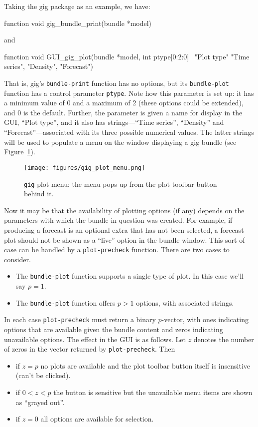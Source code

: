 \documentclass[oneside]{book}
\begin{document}
Taking the \textsf{gig} package as an example, we have:
%
\begin{code}
  function void gig_bundle_print(bundle *model)
\end{code}
%
and
%
\begin{code}
function void GUI_gig_plot(bundle *model, int ptype[0:2:0] \
                           "Plot type" {"Time series", "Density", "Forecast"})
\end{code}

That is, \textsf{gig}'s \texttt{bundle-print} function has no options,
but its \texttt{bundle-plot} function has a control parameter
\texttt{ptype}. Note how this parameter is set up: it has a minimum
value of 0 and a maximum of 2 (these options could be extended), and 0
is the default. Further, the parameter is given a name for display in
the GUI, ``Plot type'', and it also has strings---``Time series'',
``Density'' and ``Forecast''---associated with its three possible
numerical values. The latter strings will be used to populate a menu
on the window displaying a \textsf{gig} bundle
(see Figure~\ref{fig:gig-plot-menu}).
\vspace{1ex}

\begin{figure}[htbp]
  \begin{center}
  \texttt{[image: figures/gig\_plot\_menu.png]}
  \caption{\texttt{gig} plot menu: the menu pops up from the plot
    toolbar button behind it.}
  \label{fig:gig-plot-menu}
  \end{center}
\end{figure}

Now it may be that the availability of plotting options (if any)
depends on the parameters with which the bundle in question was
created. For example, if producing a forecast is an optional extra
that has not been selected, a forecast plot should not be shown as a
``live'' option in the bundle window. This sort of case can be handled
by a \texttt{plot-precheck} function. There are two cases to consider.
\begin{itemize}
\item The \texttt{bundle-plot} function supports a single type of
  plot. In this case we'll say $p = 1$.
\item The \texttt{bundle-plot} function offers $p > 1$ options, with
  associated strings.
\end{itemize}
In each case \texttt{plot-precheck} must return a binary $p$-vector,
with ones indicating options that are available given the bundle content
and zeros indicating unavailable options. The effect in the GUI is as
follows. Let $z$ denotes the number of zeros in the vector returned by
\texttt{plot-precheck}. Then
\begin{itemize}
\item if $z = p$ no plots are available and the plot toolbar button
  itself is insensitive (can't be clicked).
\item if $0 < z < p$ the button is sensitive but the unavailable menu
  items are shown as ``grayed out''.
\item if $z = 0$ all options are available for selection.
\end{itemize}
\end{document}
